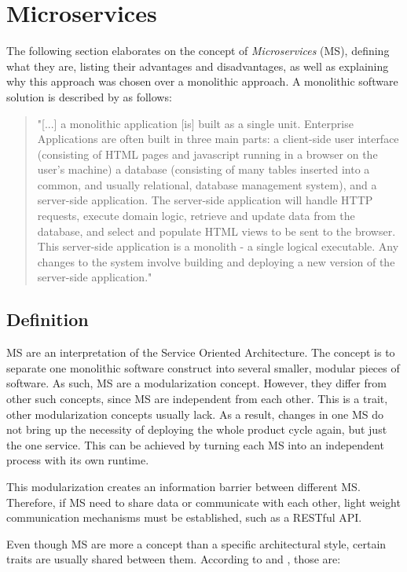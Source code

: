 \section{Microservices}
The following section elaborates on the concept of \emph{Microservices} (MS), defining what they are, listing their advantages and disadvantages, as well as explaining why this approach was chosen over a monolithic approach. A monolithic software solution is described by \cite{Lewis14} as follows:
\begin{quotation}
	"[...] a monolithic application [is] built as a single unit. Enterprise Applications are often built in three main parts: a client-side user interface (consisting of HTML pages and javascript running in a browser on the user's machine) a database (consisting of many tables inserted into a common, and usually relational, database management system), and a server-side application. The server-side application will handle HTTP requests, execute domain logic, retrieve and update data from the database, and select and populate HTML views to be sent to the browser. This server-side application is a monolith - a single logical executable. Any changes to the system involve building and deploying a new version of the server-side application."
\end{quotation}


\subsection{Definition}
\label{sec2_msDef}
MS are an interpretation of the Service Oriented Architecture. The concept is to separate one monolithic software construct into several smaller, modular pieces of software\cite{Wolff16}. As such, MS are a modularization concept. However, they differ from other such concepts, since MS are independent from each other. This is a trait, other modularization concepts usually lack\cite{Wolff16}. As a result, changes in one MS do not bring up the necessity of deploying the whole product cycle again, but just the one service. This can be achieved by turning each MS into an independent process with its own runtime\cite{Lewis14}.

This modularization creates an information barrier between different MS. Therefore, if MS need to share data or communicate with each other, light weight communication mechanisms must be established, such as a RESTful API\cite{Riggins15}.

Even though MS are more a concept than a specific architectural style, certain traits are usually shared between them\cite{Riggins15}. According to \cite{Riggins15} and \cite{Lewis14}, those are:

